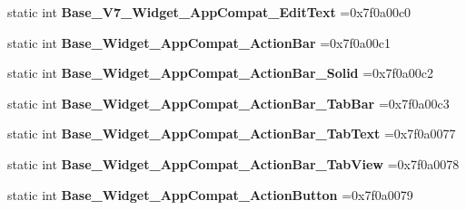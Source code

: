 \begin{DoxyCompactItemize}
\item 
\mbox{\label{classandroid_1_1support_1_1graphics_1_1drawable_1_1R_1_1style_ad9a52605a055e1edd0c7605765d46ac2}} 
static int {\bfseries Base\+\_\+\+V7\+\_\+\+Widget\+\_\+\+App\+Compat\+\_\+\+Edit\+Text} =0x7f0a00c0
\item 
\mbox{\label{classandroid_1_1support_1_1graphics_1_1drawable_1_1R_1_1style_a63995ab95dc4ad230da32cbc3ac794fd}} 
static int {\bfseries Base\+\_\+\+Widget\+\_\+\+App\+Compat\+\_\+\+Action\+Bar} =0x7f0a00c1
\item 
\mbox{\label{classandroid_1_1support_1_1graphics_1_1drawable_1_1R_1_1style_abb856054b3404767fe732f32b46432ff}} 
static int {\bfseries Base\+\_\+\+Widget\+\_\+\+App\+Compat\+\_\+\+Action\+Bar\+\_\+\+Solid} =0x7f0a00c2
\item 
\mbox{\label{classandroid_1_1support_1_1graphics_1_1drawable_1_1R_1_1style_a18e4c9147dad12df651d2a68d048723e}} 
static int {\bfseries Base\+\_\+\+Widget\+\_\+\+App\+Compat\+\_\+\+Action\+Bar\+\_\+\+Tab\+Bar} =0x7f0a00c3
\item 
\mbox{\label{classandroid_1_1support_1_1graphics_1_1drawable_1_1R_1_1style_ab459df42d427396df14b5dc327388520}} 
static int {\bfseries Base\+\_\+\+Widget\+\_\+\+App\+Compat\+\_\+\+Action\+Bar\+\_\+\+Tab\+Text} =0x7f0a0077
\item 
\mbox{\label{classandroid_1_1support_1_1graphics_1_1drawable_1_1R_1_1style_a9d521c7f7447790dad22c9378c3e2d34}} 
static int {\bfseries Base\+\_\+\+Widget\+\_\+\+App\+Compat\+\_\+\+Action\+Bar\+\_\+\+Tab\+View} =0x7f0a0078
\item 
\mbox{\label{classandroid_1_1support_1_1graphics_1_1drawable_1_1R_1_1style_a85d0b1258ca439abc1d7f49bafe1b0fb}} 
static int {\bfseries Base\+\_\+\+Widget\+\_\+\+App\+Compat\+\_\+\+Action\+Button} =0x7f0a0079
\item 

\end{DoxyCompactItemize}
